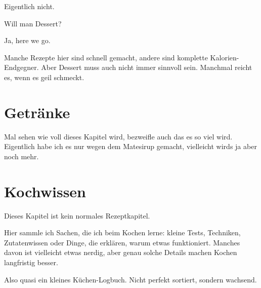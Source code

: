 \documentclass[
a4paper,
11pt
]{article}
\begin{document}
Eigentlich nicht.

Will man Dessert?

Ja, here we go.

Manche Rezepte hier sind schnell gemacht, andere sind komplette Kalorien-Endgegner. Aber Dessert muss auch nicht immer sinnvoll sein. Manchmal reicht es, wenn es geil schmeckt.

\mylocaltableofcontents%
\newpage















\section{Getränke}

Mal sehen wie voll dieses Kapitel wird, bezweifle auch das es so viel wird. Eigentlich habe ich es nur wegen dem Matesirup gemacht, vielleicht wirds ja aber noch mehr.

\mylocaltableofcontents%
\newpage







\section{Kochwissen}

Dieses Kapitel ist kein normales Rezeptkapitel.

Hier sammle ich Sachen, die ich beim Kochen lerne: kleine Tests, Techniken, Zutatenwissen oder Dinge, die erklären, warum etwas funktioniert. Manches davon ist vielleicht etwas nerdig, aber genau solche Details machen Kochen langfristig besser.

Also quasi ein kleines Küchen-Logbuch. Nicht perfekt sortiert, sondern wachsend.

\mylocaltableofcontents%
\newpage
\end{document}
